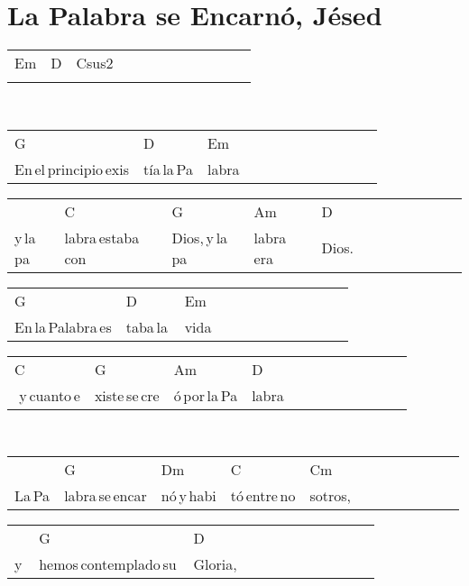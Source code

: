 \section*{La Palabra se Encarnó, Jésed\hfill}
\begin{multicols}{2}
\noindent
\begin{minipage}{\columnwidth}
\noindent
\noindent
\begin{tabular}{llllllllllll}
Em&D&Csus2\\
\quad\quad\quad\quad&\quad\quad\quad&
\end{tabular}
\end{minipage}\\

\noindent
\begin{minipage}{\columnwidth}
\noindent
\noindent
\begin{tabular}{llllllllllll}
G&D&Em\\
En\,el\,principio\,exis&tía\,la\,Pa&labra
\end{tabular}

\noindent
\begin{tabular}{llllllllllll}
&C&G&Am&D\\
y\,la\,pa&labra\,estaba\,con\,&Dios,\,y\,la\,pa&labra\,era\,&Dios.
\end{tabular}

\noindent
\begin{tabular}{llllllllllll}
G&D&Em\\
En\,la\,Palabra\,es&taba\,la\,&vida
\end{tabular}

\noindent
\begin{tabular}{llllllllllll}
C&G&Am&D\\
\,\,y\,cuanto\,e&xiste\,se\,cre&ó\,por\,la\,Pa&labra
\end{tabular}
\end{minipage}\\

\noindent
\begin{minipage}{\columnwidth}
\noindent
\noindent
\begin{tabular}{llllllllllll}
&G&Dm&C&Cm\\
La\,Pa&labra\,se\,encar&nó\,y\,habi&tó\,entre\,no&sotros,
\end{tabular}

\noindent
\begin{tabular}{llllllllllll}
&G&D\\
y\,&hemos\,contemplado\,su\,&Gloria,
\end{tabular}


\end{minipage}
\end{multicols}
